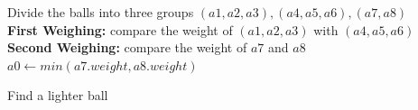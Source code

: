\documentclass{assignment}
\begin{document}
\begin{homeworkProblem}
\begin{enumerate}
     \begin{algorithm}[H]
 \BlankLine
Divide the balls into three groups $(a1, a2, a3), (a4,a5,a6), (a7, a8)$ \\
\textbf{First Weighing:} compare the weight of $(a1,a2,a3)$ with $(a4,a5,a6)$ \\
 {
\textbf{Second Weighing:} compare the weight of $a7$ and $a8$ \\
$a0 \leftarrow min(a7.weight, a8.weight)$\\
} 
\caption{Find a lighter ball} \end{algorithm}
    \end{enumerate}
    
    \end{homeworkProblem}
    
\end{document}
